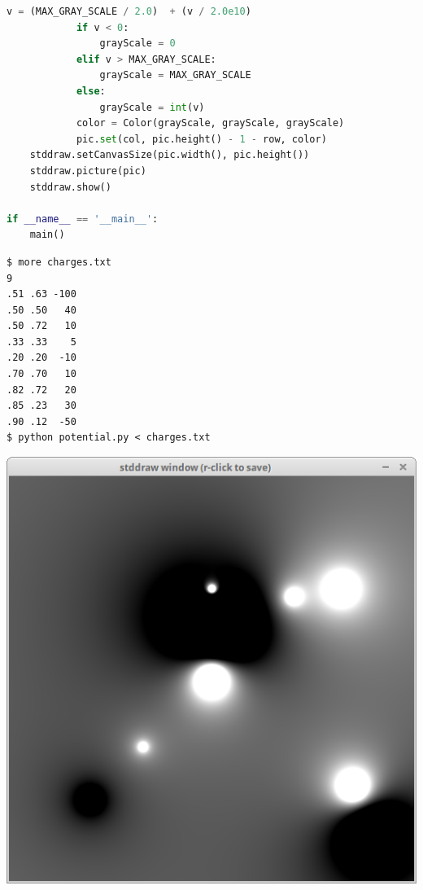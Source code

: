 \documentclass[8pt,a4paper,compress,handout]{beamer}
\begin{document}
\begin{frame}[fragile]
\begin{lstlisting}[language=Python]
            v = (MAX_GRAY_SCALE / 2.0)  + (v / 2.0e10)
            if v < 0:
                grayScale = 0
            elif v > MAX_GRAY_SCALE:
                grayScale = MAX_GRAY_SCALE
            else:
                grayScale = int(v)            
            color = Color(grayScale, grayScale, grayScale)
            pic.set(col, pic.height() - 1 - row, color)
    stddraw.setCanvasSize(pic.width(), pic.height())
    stddraw.picture(pic)
    stddraw.show()

if __name__ == '__main__':
    main()
\end{lstlisting}
\begin{minipage}{150pt}
\begin{lstlisting}[language={}]
$ more charges.txt
9
.51 .63 -100
.50 .50   40
.50 .72   10
.33 .33    5
.20 .20  -10
.70 .70   10
.82 .72   20
.85 .23   30
.90 .12  -50
$ python potential.py < charges.txt
\end{lstlisting}
\end{minipage}%
\begin{minipage}{150pt}
\begin{center}
\hfill \includegraphics[scale=0.2]{figures/potential.png}
\end{center}
\end{minipage}
\end{frame}
\end{document}
